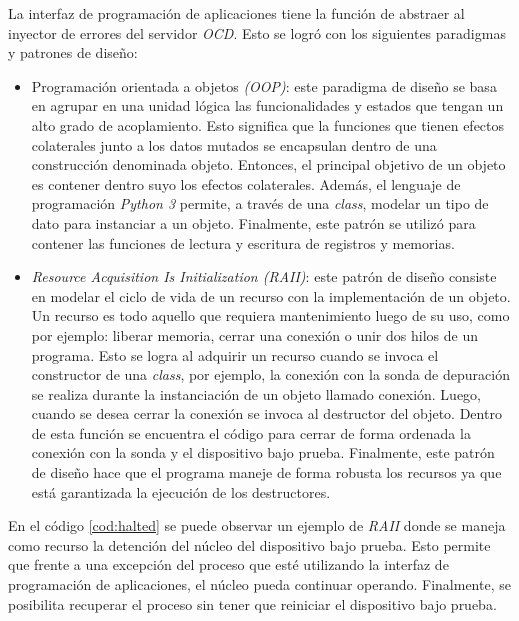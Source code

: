 La interfaz de programación de aplicaciones tiene la función de abstraer al inyector de errores del servidor \emph{OCD}.
Esto se logró con los siguientes paradigmas y patrones de diseño:

\begin{itemize}
    \item Programación orientada a objetos \emph{(OOP)}: este paradigma de diseño se basa en agrupar en una unidad lógica las funcionalidades y estados que tengan un alto grado de acoplamiento.
        Esto significa que la funciones que tienen efectos colaterales junto a los datos mutados se encapsulan dentro de una construcción denominada objeto.
        Entonces, el principal objetivo de un objeto es contener dentro suyo los efectos colaterales.
        Además, el lenguaje de programación \emph{Python 3} permite, a través de una \emph{class}, modelar un tipo de dato para instanciar a un objeto.
        Finalmente, este patrón se utilizó para contener las funciones de lectura y escritura de registros y memorias.
    \item \emph{Resource Acquisition Is Initialization (RAII)}: este patrón de diseño consiste en modelar el ciclo de vida de un recurso con la implementación de un objeto.
        Un recurso es todo aquello que requiera mantenimiento luego de su uso, como por ejemplo: liberar memoria, cerrar una conexión o unir dos hilos de un programa.
        Esto se logra al adquirir un recurso cuando se invoca el constructor de una \emph{class}, por ejemplo, la conexión con la sonda de depuración se realiza durante la instanciación de un objeto llamado conexión.
        Luego, cuando se desea cerrar la conexión se invoca al destructor del objeto.
        Dentro de esta función se encuentra el código para cerrar de forma ordenada la conexión con la sonda y el dispositivo bajo prueba.
        Finalmente, este patrón de diseño hace que el programa maneje de forma robusta los recursos ya que está garantizada la ejecución de los destructores.
\end{itemize}

En el código \ref{cod:halted} se puede observar un ejemplo de \emph{RAII} donde se maneja como recurso la detención del núcleo del dispositivo bajo prueba.
Esto permite que frente a una excepción del proceso que esté utilizando la interfaz de programación de aplicaciones, el núcleo pueda continuar operando.
Finalmente, se posibilita recuperar el proceso sin tener que reiniciar el dispositivo bajo prueba.

